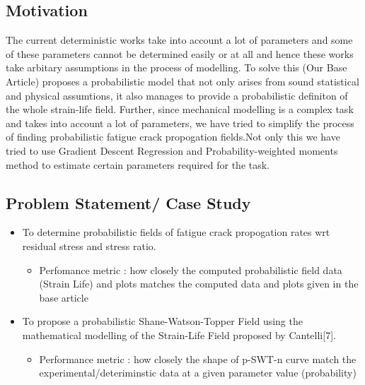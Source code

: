 \documentclass[11pt]{article}
\providecommand{\tightlist}{%
      \setlength{\itemsep}{0pt}\setlength{\parskip}{0pt}}
\begin{document}
\hypertarget{motivation}{%
\subsection{Motivation}\label{motivation}}

The current deterministic works take into account a lot of parameters
and some of these parameters cannot be determined easily or at all and
hence these works take arbitary assumptions in the process of modelling.
To solve this (Our Base Article) proposes a probabilistic model that not
only arises from sound statistical and physical assumtions, it also
manages to provide a probabilistic definiton of the whole strain-life
field. Further, since mechanical modelling is a complex task and takes
into account a lot of parameters, we have tried to simplify the process
of finding probabilistic fatigue crack propogation fields.Not only this
we have tried to use Gradient Descent Regression and
Probability-weighted moments method to estimate certain parameters
required for the task.

\hypertarget{problem-statement-case-study}{%
\subsection{Problem Statement/ Case
Study}\label{problem-statement-case-study}}

\begin{itemize}
\tightlist
\item
  To determine probabilistic fields of fatigue crack propogation rates
  wrt residual stress and stress ratio.

  \begin{itemize}
  \tightlist
  \item
    Perfomance metric : how closely the computed probabilistic field
    data (Strain Life) and plots matches the computed data and plots
    given in the base article
  \end{itemize}
\item
  To propose a probabilistic Shane-Watson-Topper Field using the
  mathematical modelling of the Strain-Life Field proposed by
  Cantelli{[}7{]}.

  \begin{itemize}
  \tightlist
  \item
    Performance metric : how closely the shape of p-SWT-n curve match
    the experimental/deteriminstic data at a given parameter value
    (probability)
  \end{itemize}
\end{itemize}
\end{document}
